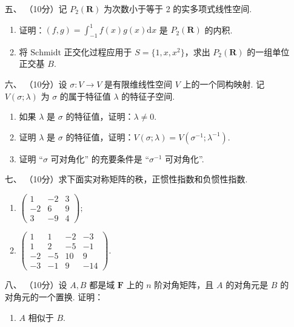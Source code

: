 \begin{enumerate}
    \item [五、]（10分）记 $P_2(\mathbf{R})$ 为次数小于等于 2 的实多项式线性空间.
    \begin{enumerate}[label=(\arabic*)]
        \item 证明：$(f,g)=\int_{-1}^1f(x)g(x)\mathrm{d}x$ 是 $P_2(\mathbf{R})$ 的内积.

        \item 将 $\mathrm{Schmidt}$ 正交化过程应用于 $S=\{1,x,x^2\}$，求出 $P_2(\mathbf{R})$ 的一组单位正交基 $B$.
    \end{enumerate}

\item [六、]（10分）设 $\sigma:V\to V$ 是有限维线性空间 $V$ 上的一个同构映射. 记 $V(\sigma;\lambda)$ 为 $\sigma$ 的属于特征值 $\lambda$ 的特征子空间.
    \begin{enumerate}[label=(\arabic*)]
        \item 如果 $\lambda$ 是 $\sigma$ 的特征值，证明：$\lambda \neq 0$.

        \item 证明 $\lambda$ 是 $\sigma$ 的特征值，证明：$V(\sigma;\lambda)=V(\sigma^{-1};\lambda^{-1})$.

        \item 证明 ``$\sigma$ 可对角化'' 的充要条件是 ``$\sigma^{-1}$ 可对角化''.
    \end{enumerate}

\item [七、]（10分）求下面实对称矩阵的秩，正惯性指数和负惯性指数.
    \begin{enumerate}[label=(\arabic*)]
        \item $\begin{pmatrix}1 & -2 & 3 \\ -2 & 6 & 9 \\ 3 & -9 & 4\end{pmatrix};$

        \item $\begin{pmatrix}1 & 1 & -2 & -3\\ 1 & 2 & -5 & -1 \\ -2 & -5 & 10 & 9 \\ -3 & -1 & 9 & -14\end{pmatrix}$.
    \end{enumerate}

\item [八、]（10分）设 $A,B$ 都是域 $\mathbf{F}$ 上的 $n$ 阶对角矩阵，且 $A$ 的对角元是 $B$ 的对角元的一个置换. 证明：
    \begin{enumerate}[label=(\arabic*)]
        \item $A$ 相似于 $B$.


\end{enumerate}
\end{enumerate}
